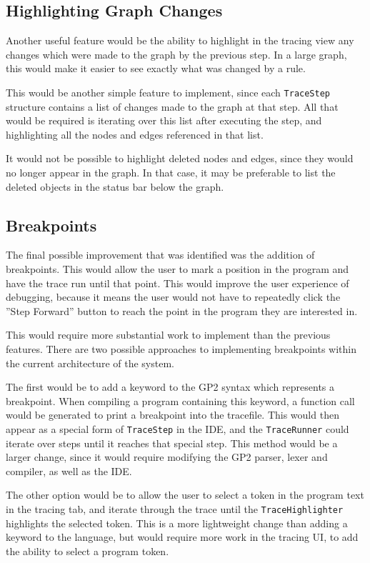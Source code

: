 \documentclass[authoryearcitations]{UoYCSproject}
\begin{document}
\subsection{Highlighting Graph Changes}
\label{sec:HighlightingGraphChanges}

Another useful feature would be the ability to highlight in the tracing
view any changes which were made to the graph by the previous step. In a large
graph, this would make it easier to see exactly what was changed by a rule.

This would be another simple feature to implement, since each \texttt{TraceStep}
structure contains a list of changes made to the graph at that step. All that
would be required is iterating over this list after executing the step, and
highlighting all the nodes and edges referenced in that list.

It would not be possible to highlight deleted nodes and edges, since they would
no longer appear in the graph. In that case, it may be preferable to list the
deleted objects in the status bar below the graph.

\subsection{Breakpoints}
\label{sec:FWBreakpoints}

The final possible improvement that was identified was the addition of breakpoints.
This would allow the user to mark a position in the program and have the trace run
until that point. This would improve the user experience of debugging, because
it means the user would not have to repeatedly click the ''Step Forward'' button
to reach the point in the program they are interested in.

This would require more substantial work to implement than the previous
features. There are two possible approaches to implementing breakpoints within
the current architecture of the system.

The first would be to add a keyword to the GP2 syntax which represents a
breakpoint. When compiling a program containing this keyword, a function call
would be generated to print a breakpoint into the tracefile. This would then
appear as a special form of \texttt{TraceStep} in the IDE, and the \texttt{TraceRunner}
could iterate over steps until it reaches that special step. This method would
be a larger change, since it would require modifying the GP2 parser, lexer and
compiler, as well as the IDE.

The other option would be to allow the user to select a token in the program
text in the tracing tab, and iterate through the trace until the \texttt{TraceHighlighter}
highlights the selected token. This is a more lightweight change than adding
a keyword to the language, but would require more work in the tracing UI, to 
add the ability to select a program token.
\end{document}
